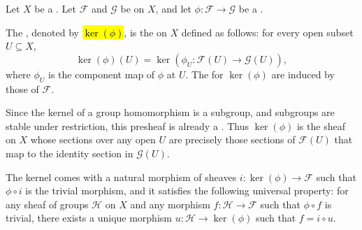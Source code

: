 \begin{definition} \label{definition:kernel_of_a_morphism_of_sheaves_of_groups_on_a_topological_space}
    Let $X$ be a . Let $\mathcal{F}$ and $\mathcal{G}$ be  on $X$, and let $\phi: \mathcal{F} \to \mathcal{G}$ be a .

    The , denoted by \hl{$\ker(\phi)$}, is the  on $X$ defined as follows: for every open subset $U \subseteq X$,
    $$\ker(\phi)(U) = \ker(\phi_U: \mathcal{F}(U) \to \mathcal{G}(U)),$$
    where $\phi_U$ is the component map of $\phi$ at $U$. The  for $\ker(\phi)$ are induced by those of $\mathcal{F}$.

    Since the kernel of a group homomorphism is a subgroup, and subgroups are stable under restriction, this presheaf is already a . Thus $\ker(\phi)$ is the sheaf on $X$ whose sections over any open $U$ are precisely those sections of $\mathcal{F}(U)$ that map to the identity section in $\mathcal{G}(U)$.

    The kernel comes with a natural morphism of sheaves $i: \ker(\phi) \to \mathcal{F}$ such that $\phi \circ i$ is the trivial morphism, and it satisfies the following universal property: for any sheaf of groups $\mathcal{H}$ on $X$ and any morphism $f: \mathcal{H} \to \mathcal{F}$ such that $\phi \circ f$ is trivial, there exists a unique morphism $u: \mathcal{H} \to \ker(\phi)$ such that $f = i \circ u$.
\end{definition}
